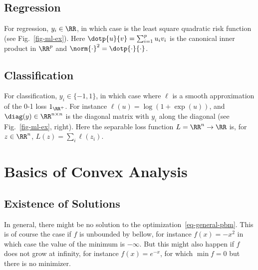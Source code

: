 \subsection{Regression}

For regression, $y_i \in \RR$, in which case
is the least square quadratic risk function (see Fig.~\ref{fig-ml-ex}).
%
Here $\dotp{u}{v}=\sum_{i=1}^p u_i v_i$ is the canonical inner product in $\RR^p$ and $\norm{\cdot}^2=\dotp{\cdot}{\cdot}$. 


\subsection{Classification}

For classification, $y_i \in \{-1,1\}$, in which case
where $\ell$ is a smooth approximation of the 0-1 loss $1_{\RR^+}$.
%
For instance $\ell(u)=\log(1+\exp(u))$, and $\diag(y) \in \RR^{n \times n}$ is the diagonal matrix with $y_i$ along the diagonal (see Fig.~\ref{fig-ml-ex}, right). Here the separable loss function $L = \RR^n \rightarrow \RR$ is, for $z \in \RR^n$, $L(z)=\sum_i \ell(z_i)$. 


\section{Basics of Convex Analysis}

\subsection{Existence of Solutions}

In general, there might be no solution to the optimization~\eqref{eq-general-pbm}. This is of course the case if $f$ is unbounded by bellow, for instance $f(x)=-x^2$ in which case the value of the minimum is $-\infty$. But this might also happen if $f$ does not grow at infinity, for instance $f(x)=e^{-x}$, for which $\min f = 0$ but there is no minimizer.

